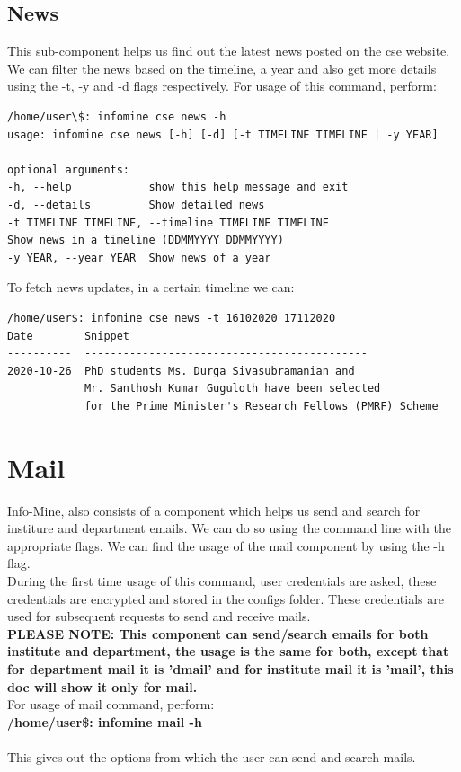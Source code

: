 \documentclass[12pt, letterpaper, twoside]{article}
\begin{document}
\subsection{News}
This sub-component helps us find out the latest news posted on the cse website.
We can filter the news based on the timeline, a year and also get more details using the -t, -y and -d flags respectively.
For usage of this command, perform:
\begin{verbatim}
/home/user\$: infomine cse news -h
usage: infomine cse news [-h] [-d] [-t TIMELINE TIMELINE | -y YEAR]

optional arguments:
-h, --help            show this help message and exit
-d, --details         Show detailed news
-t TIMELINE TIMELINE, --timeline TIMELINE TIMELINE
Show news in a timeline (DDMMYYYY DDMMYYYY)
-y YEAR, --year YEAR  Show news of a year   
\end{verbatim}
To fetch news updates, in a certain timeline we can:
\begin{verbatim}
/home/user$: infomine cse news -t 16102020 17112020
Date        Snippet
----------  --------------------------------------------
2020-10-26  PhD students Ms. Durga Sivasubramanian and 
            Mr. Santhosh Kumar Guguloth have been selected 
            for the Prime Minister's Research Fellows (PMRF) Scheme

\end{verbatim}
\section{Mail}
Info-Mine, also consists of a component which helps us send and search for institure and department emails. We can do so using the command line with the appropriate flags. We can find the usage of the mail component by using the -h flag.\\
During the first time usage of this command, user credentials are asked, these credentials are encrypted and stored in the configs folder. These credentials are used for subsequent requests to send and receive mails.\\
\textbf{PLEASE NOTE: This component can send/search emails for both institute and department, the usage is the same for both, except that for department mail it is 'dmail' and for institute mail it is 'mail', this doc will show it only for mail.}\\
For usage of mail command, perform:\\
\textbf{/home/user\$: infomine mail -h}\\
\\
This gives out the options from which the user can send and search mails.\\
\end{document}
